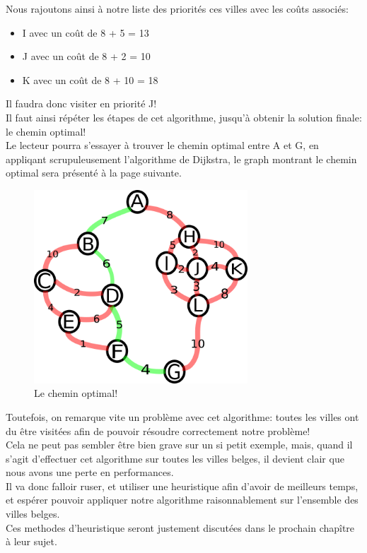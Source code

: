 \documentclass[a4paper, 12pt]{article}
\numberwithin{equation}{subsection}
\begin{document}
Nous rajoutons ainsi à notre liste des priorités ces villes avec les coûts associés: \\
\begin{itemize}
  \item I avec un coût de 8 + 5 = 13
  \item J avec un coût de 8 + 2 = 10
  \item K avec un coût de 8 + 10 = 18
\end{itemize}
Il faudra donc visiter en priorité J! \\
Il faut ainsi répéter les étapes de cet algorithme, jusqu'à obtenir la solution finale: le chemin optimal! \\
Le lecteur pourra s'essayer à trouver le chemin optimal entre A et G, en appliqant scrupuleusement l'algorithme de Dijkstra, le graph montrant le chemin optimal sera présenté à la page suivante.
\begin{figure}[!hbt]
  \centering
  \includegraphics[width=8.0cm]{imgs/solved.png}
  \caption{Le chemin optimal!}
\end{figure}
Toutefois, on remarque vite un problème avec cet algorithme: toutes les villes ont du être visitées afin de pouvoir résoudre correctement notre problème! \\
Cela ne peut pas sembler être bien grave sur un si petit exemple, mais, quand il s'agit d'effectuer cet algorithme sur toutes les villes belges, il devient clair que nous avons une perte en performances.\\
Il va donc falloir ruser, et utiliser une heuristique afin d'avoir de meilleurs temps, et espérer pouvoir appliquer notre algorithme raisonnablement sur l'ensemble des villes belges. \\
Ces methodes d'heuristique seront justement discutées dans le prochain chapître à leur sujet. \\
\end{document}
